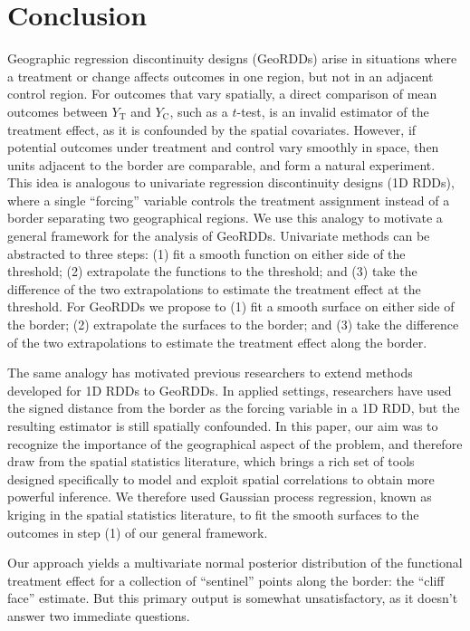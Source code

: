 \documentclass[letter]{article}
\newcommand{\treat}{\mathrm{T}}
\newcommand{\ctrol}{\mathrm{C}}
\begin{document}
    	\section{Conclusion}\label{conclusion}
    


    	Geographic regression discontinuity designs (GeoRDDs) arise in situations where a treatment or change affects outcomes in one region, but not in an adjacent control region.
For outcomes that vary spatially, a direct comparison of mean outcomes between \(Y_\treat\) and \(Y_\ctrol\), such as a \(t\)-test, is an invalid estimator of the treatment effect, as it is confounded by the spatial covariates.
However, if potential outcomes under treatment and control vary smoothly in space, then units adjacent to the border are comparable, and form a natural experiment.
This idea is analogous to univariate regression discontinuity designs (1D RDDs), where a single ``forcing'' variable controls the treatment assignment instead of a border separating two geographical regions.
We use this analogy to motivate a general framework for the analysis of GeoRDDs.
Univariate methods can be abstracted to three steps: (1) fit a smooth function on either side of the threshold; (2) extrapolate the functions to the threshold; and (3) take the difference of the two extrapolations to estimate the treatment effect at the threshold.
For GeoRDDs we propose to (1) fit a smooth surface on either side of the border; (2) extrapolate the surfaces to the border; and (3) take the difference of the two extrapolations to estimate the treatment effect along the border.

The same analogy has motivated previous researchers to extend methods developed for 1D RDDs to GeoRDDs.
In applied settings, researchers have used the signed distance from the border as the forcing variable in a 1D RDD, but the resulting estimator is still spatially confounded.
In this paper, our aim was to recognize the importance of the geographical aspect of the problem, and therefore draw from the spatial statistics literature, which brings a rich set of tools designed specifically to model and exploit spatial correlations to obtain more powerful inference.
We therefore used Gaussian process regression, known as kriging in the spatial statistics literature, to fit the smooth surfaces to the outcomes in step (1) of our general framework.
    


    	Our approach yields a multivariate normal posterior distribution of the functional treatment effect for a collection of ``sentinel'' points along the border: the ``cliff face'' estimate.
But this primary output is somewhat unsatisfactory, as it doesn't answer two immediate questions.
    
\end{document}
